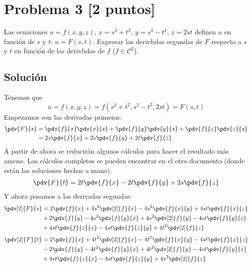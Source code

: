 \documentclass[12pt,a4paper,reqno]{article}
\newcommand{\cC}{\mathcal{C}}
\begin{document}
	\section{Problema 3 [2 puntos]}
	Las ecuaciones $u=f(x,y,z)$, $x=s^2+t^2$, $y=s^2-t^2$, $z=2st$ definen $u$ en función de $s$ y $t$: $u=F(s,t)$. Expresar las derivbdas segundas de $F$ respecto a $s$ y $t$ en función de las derivbdas de $f$ ($f\in\cC^2$).
	
	\subsection*{Solución}
	Tenemos que
	\[
		u = f(x,y,z)=f(s^{2} + t ^{2}, s ^{2}-t ^{2}, 2st)=F(s,t)
	\]
	Empezamos con las derivadas primeras:
	\begin{equation}
		\begin{split}
			\pdv{F}{s}&= \pdv{f}{x}\pdv{x}{s} + \pdv{f}{y}\pdv{y}{s} +\pdv{f}{z}\pdv{z}{s}\\
					  &= 2s \pdv{f}{x}+2s\pdv{f}{y}+2t\pdv{f}{z}
		\end{split}
	\end{equation}
	A partir de ahora se reducirán algunos cálculos para hacer el resultado más ameno. Los cálculos completos se pueden encontrar en el otro documento (donde están las soluciones hechas a mano).
	\begin{equation}
		\begin{split}
			\pdv{F}{t} = 2t\pdv{f}{x}-2t\pdv{f}{y}+2s\pdv{f}{z}
		\end{split}
	\end{equation}
	Y ahora pasamos a las derivadas segundas:
	\begin{equation}
		\begin{split}
			\pdv[2]{F}{s} &= 2\pdv{f}{x} +4s ^{2}\pdv[2]{f}{x}-4s^{2}\pdv{f}{x}{y} +4st \pdv{f}{x}{z}\\
						  &+2\pdv{f}{y} - 4s^{2}\pdv{f}{y}{x}+4s^{2}\pdv[2]{f}{y}-4st\pdv{f}{y}{z}\\
						  &+4st\pdv{f}{z}{x}-4st\pdv{f}{z}{y}+4t^{2}\pdv[2]{f}{z}
		\end{split}
	\end{equation}
	\begin{equation}
		\begin{split}
			\pdv[2]{F}{t} &= 2\pdv{f}{x}+4t^{2}\pdv[2]{f}{x}-4t^{2}\pdv{f}{x}{y}-4st\pdv{f}{x}{z}\\
						  &-2\pdv{f}{y}-4t^{2}\pdv{f}{y}{x}+4t^{2}\pdv[2]{f}{y}-4st\pdv{f}{y}{z}\\
						  &+4st\pdv{f}{z}{x}-4st\pdv{f}{z}{y}+4s^{2}\pdv[2]{f}{z}
		\end{split}
	\end{equation}
\end{document}
